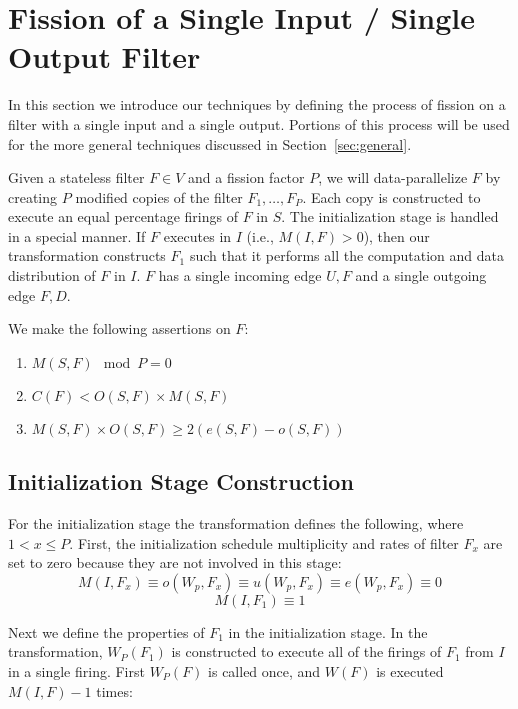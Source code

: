 \section{Fission of a Single Input / Single Output Filter}
\label{sec:single}

In this section we introduce our techniques by defining the
process of fission on a filter with a single input and a single
output. Portions of this process will be used for the more general
techniques discussed in Section~\ref{sec:general}. 

Given a stateless filter $F \in V$ and a fission factor $P$, we will
data-parallelize $F$ by creating $P$ modified copies of the filter
$F_1, \ldots, F_P$.  Each copy is constructed to execute an equal
percentage firings of $F$ in $S$.  The initialization stage is handled
in a special manner.  If $F$ executes in $I$ (i.e., $M(I,F) > 0$),
then our transformation constructs $F_1$ such that it performs all the
computation and data distribution of $F$ in $I$. $F$ has a single
incoming edge ${U,F}$ and a single outgoing edge ${F, D}$.


We make the following assertions on $F$:

\begin{enumerate}

\item $M(S,F) \mod  P = 0$

\item $C(F) < O(S,F) \times M(S,F)$

\item $M(S,F) \times O(S,F) \ge 2(e(S,F) - o(S,F))$

\end{enumerate}


\subsection{Initialization Stage Construction}

For the initialization stage the transformation defines the following,
where $1 < x \le P$. First, the initialization
schedule multiplicity and rates of filter $F_x$ are set to zero
because they are not involved in this stage:
$$ M(I,F_x) \equiv o(W_p,F_x) \equiv u(W_p,F_x) \equiv e(W_p,F_x)
\equiv 0 $$
$$ M(I,F_1) \equiv 1 $$

Next we define the properties of $F_1$ in the initialization stage. In
the transformation, $W_P(F_1)$ is constructed to execute all of the
firings of $F_1$ from $I$ in a single firing.  First $W_P(F)$ is
called once, and $W(F)$ is executed $M(I,F) - 1$ times:

